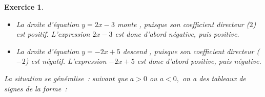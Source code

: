 \documentclass[10pt]{article}
\newtheorem{exo}{Exercice}
\begin{document}
\begin{exo}
\begin{enumerate}
\begin{itemize}
\begin{multicols}{2}


\begin{align*}
2x-3&=0\\
2x-\cancel{3}+\cancel{3}&=0+3\\
\frac{\cancel{2}x}{\cancel{2}}&=\frac{3}{2}\\
x&=1,5
\end{align*}

\columnbreak

\begin{align*}
-2x+5&=0\\
-2x+\cancel{5}-\cancel{5}&=0-5\\
\frac{\cancel{-2}x}{\cancel{-2}}&=\frac{-5}{-2}\\
x&=2,5
\end{align*}

\end{multicols}


\item[\textbullet] La droite d'équation $y=2x-3$ \og monte \fg, puisque son coefficient directeur ($2$) est positif. L'expression $2x-3$ est donc d'abord négative, puis positive.
\item[\textbullet] La droite d'équation $y=-2x+5$ \og descend \fg, puisque son coefficient directeur ($-2$) est négatif. L'expression $-2x+5$ est donc d'abord positive, puis négative.
\end{itemize}

\medskip

La situation se généralise~: suivant que $a>0$ ou $a<0,$ on a des tableaux de signes de la forme~:

\begin{multicols}{2}



\begin{center}


\end{center}

\columnbreak



\begin{center}


\end{center}


\end{multicols}
\end{enumerate}
\end{exo}
\end{document}
